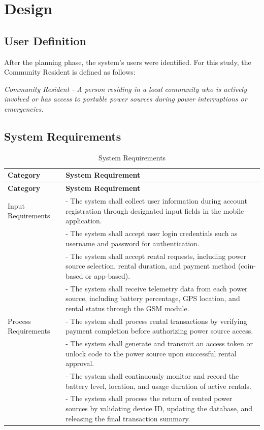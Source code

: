 {\section{Design}
\subsection{User Definition}

After the planning phase, the system’s users were identified. For this study, the Community Resident is defined as follows:

\textit{Community Resident - A person residing in a local community who is actively involved or has access to portable power sources during power interruptions or emergencies.}

\subsection{System Requirements}

\begin{longtable}{p{4cm} p{9cm}}
	\caption{System Requirements} \label{tab:SystemRequirements} \\
	\toprule
	\textbf{Category} & \textbf{System Requirement} \\
	\midrule
	\endfirsthead
	
	\toprule
	\textbf{Category} & \textbf{System Requirement} \\
	\midrule
	\endhead
	
	\bottomrule
	\endfoot
	
	Input Requirements & - The system shall collect user information during account registration through designated input fields in the mobile application. \\
	& - The system shall accept user login credentials such as username and password for authentication. \\
	& - The system shall accept rental requests, including power source selection, rental duration, and payment method (coin-based or app-based).\\
	& - The system shall receive telemetry data from each power source, including battery percentage, GPS location, and rental status through the GSM module. \\
	\midrule
	
	Process Requirements & - The system shall process rental transactions by verifying payment completion before authorizing power source access. \\
	& - The system shall generate and transmit an access token or unlock code to the power source upon successful rental approval. \\
	& - The system shall continuously monitor and record the battery level, location, and usage duration of active rentals. \\
	& - The system shall process the return of rented power sources by validating device ID, updating the database, and releasing the final transaction summary. \\
	\midrule
	

\end{longtable}}
